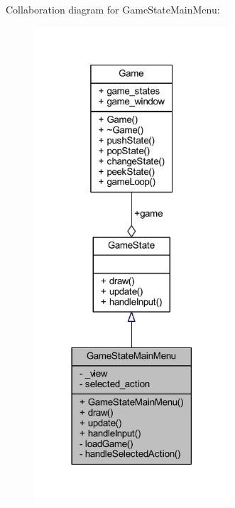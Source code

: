 Collaboration diagram for Game\+State\+Main\+Menu\+:
\nopagebreak
\begin{figure}[H]
\begin{center}
\leavevmode
\includegraphics[width=206pt]{class_game_state_main_menu__coll__graph}
\end{center}
\end{figure}
